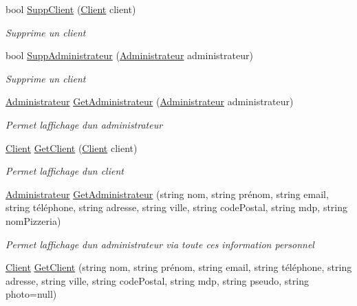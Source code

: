 \begin{DoxyCompactItemize}
bool \hyperlink{classModele_1_1Manager_a27aa5c5077667211da410d55fd6c17b9}{Supp\+Client} (\hyperlink{classModele_1_1Client}{Client} client)
\begin{DoxyCompactList}\small\item\em Supprime un client \end{DoxyCompactList}\item 
bool \hyperlink{classModele_1_1Manager_ac06a3ffe203cb1ae9b91928bdb54e63f}{Supp\+Administrateur} (\hyperlink{classModele_1_1Administrateur}{Administrateur} administrateur)
\begin{DoxyCompactList}\small\item\em Supprime un client \end{DoxyCompactList}\item 
\hyperlink{classModele_1_1Administrateur}{Administrateur} \hyperlink{classModele_1_1Manager_a48bd7f374cd7f0875a99145a2fe22089}{Get\+Administrateur} (\hyperlink{classModele_1_1Administrateur}{Administrateur} administrateur)
\begin{DoxyCompactList}\small\item\em Permet l\textquotesingle{}affichage d\textquotesingle{}un administrateur \end{DoxyCompactList}\item 
\hyperlink{classModele_1_1Client}{Client} \hyperlink{classModele_1_1Manager_a4c99d9b62a7d210103d5590d79781f41}{Get\+Client} (\hyperlink{classModele_1_1Client}{Client} client)
\begin{DoxyCompactList}\small\item\em Permet l\textquotesingle{}affichage d\textquotesingle{}un client \end{DoxyCompactList}\item 
\hyperlink{classModele_1_1Administrateur}{Administrateur} \hyperlink{classModele_1_1Manager_a013250c8b389540f4ed1683a00354118}{Get\+Administrateur} (string nom, string prénom, string email, string téléphone, string adresse, string ville, string code\+Postal, string mdp, string nom\+Pizzeria)
\begin{DoxyCompactList}\small\item\em Permet l\textquotesingle{}affichage d\textquotesingle{}un administrateur via toute ces information personnel \end{DoxyCompactList}\item 
\hyperlink{classModele_1_1Client}{Client} \hyperlink{classModele_1_1Manager_ac9e68b03d52226cb7a4c91864b67226a}{Get\+Client} (string nom, string prénom, string email, string téléphone, string adresse, string ville, string code\+Postal, string mdp, string pseudo, string photo=null)

\end{DoxyCompactItemize}
